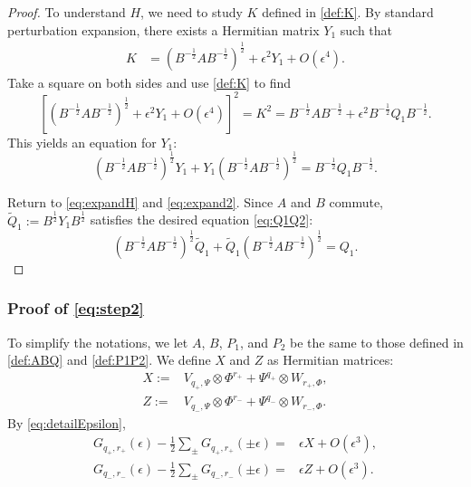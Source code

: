 \documentclass{article}
\numberwithin{equation}{section}
\begin{document}
\begin{proof}
To understand $H$, we need to study $K$ defined in \eqref{def:K}. By standard perturbation expansion, there exists a Hermitian matrix $Y_1$ such that
\begin{align}\label{eq:expand2}
    K&=  (B^{-\frac{1}{2}} A B^{-\frac{1}{2}})^{\frac{1}{2}} + \epsilon^2 Y_1 + O(\epsilon^4).
\end{align}
Take a square on both sides and use \eqref{def:K} to find
\begin{equation*}
  \left[ (B^{-\frac{1}{2}} A B^{-\frac{1}{2}})^{\frac{1}{2}} + \epsilon^2 Y_1 + O(\epsilon^4) \right]^2=K^2=B^{-\frac{1}{2}} A B^{-\frac{1}{2}} + \epsilon^2 B^{-\frac{1}{2}} Q_1 B^{-\frac{1}{2}}.
\end{equation*}
This yields an equation for $Y_1$:
\[
(B^{-\frac{1}{2}} A B^{-\frac{1}{2}})^{\frac{1}{2}} Y_1 + Y_1 (B^{-\frac{1}{2}} A B^{-\frac{1}{2}})^{\frac{1}{2}} = B^{-\frac{1}{2}} Q_1 B^{-\frac{1}{2}}.
\]

Return to \eqref{eq:expandH} and \eqref{eq:expand2}. Since $A$ and $B$ commute, $\tilde{Q}_1 := B^{\frac{1}{2}} Y_1 B^{\frac{1}{2}}$ satisfies the desired equation \eqref{eq:Q1Q2}:
\[
(B^{-\frac{1}{2}} A B^{-\frac{1}{2}})^{\frac{1}{2}} \tilde{Q}_1 + \tilde{Q}_1 (B^{-\frac{1}{2}} A B^{-\frac{1}{2}})^{\frac{1}{2}} = Q_1.
\]

\end{proof}




\subsubsection{Proof of \eqref{eq:step2}}\label{subsub:step2}
To simplify the notations, we let $A$, $B$, $P_1$, and $P_2$ be the same to those defined in \eqref{def:ABQ} and \eqref{def:P1P2}. We define $X$ and $Z$ as Hermitian matrices:
\begin{align*}
    X:=&V_{q_{+},\Psi}\otimes \Phi^{r_{+}}+ \Psi^{q_{+}}\otimes W_{r_{+},\Phi},\\
    Z:=&V_{q_{-},\Psi}\otimes \Phi^{r_{-}}+ \Psi^{q_{-}}\otimes W_{r_{-},\Phi}.
\end{align*}
By \eqref{eq:detailEpsilon},
\begin{align*}
G_{q_+, r_+}(\epsilon)-\frac{1}{2}  \sum_{\pm}G_{q_+, r_+}(\pm\epsilon)    =&  \epsilon X  + O(\epsilon^3), \\
G_{q_-, r_-}(\epsilon)-\frac{1}{2}  \sum_{\pm}G_{q_-, r_-}(\pm\epsilon)    =&  \epsilon  Z + O(\epsilon^3).
\end{align*}
\end{document}
